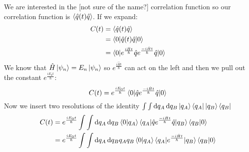 \documentclass[12pt,letterpaper,oneside,final,titlepage]{article}               %
\numberwithin{equation}{section} %
\newcommand{\emiHt}{e^{\frac{-i\hat{H}t}{\hbar}}}
\newcommand{\eiHt}{e^{\frac{i\hat{H}t}{\hbar}}}
\begin{document}
We are interested in the [not sure of the name?] correlation function so our correlation function is $\braket{\hat{q}(t)\hat{q}}$. 
If we expand:
\begin{align}
    C(t) &= \braket{\hat{q}(t)\hat{q}}
    \\   &= \braket{0|\hat{q}(t)\hat{q}|0}
    \\   &= \braket{0|\eiHt\hat{q}\emiHt\hat{q}|0}
\end{align}
We know that $\hat{H}\ket{\psi_{n}} = E_{n}\ket{\psi_{n}}$ so $\eiHt$ can act on the left and 
then we pull out the constant $e^{\frac{iE_{0}t}{\hbar}}$:\\
\begin{equation}
    C(t) = e^{\frac{iE_{0}t}{\hbar}}\braket{0|\hat{q}\emiHt\hat{q}|0}
\end{equation}
Now we insert two resolutions of the identity
$\int\int \dif q_{A}\dif q_{B} \ket{q_{A}}\bra{q_{A}}\ket{q_{B}}\bra{q_{B}}$
\begin{align}
    C(t) &= e^{\frac{iE_{0}t}{\hbar}}\int\int \dif q_{A}\dif q_{B} 
    \braket{0|q_{A}}\braket{q_{A}|\hat{q}\emiHt\hat{q}|q_{B}}\braket{q_{B}|0}
    \\   &= e^{\frac{iE_{0}t}{\hbar}}\int\int \dif q_{A}\dif q_{B} 
    q_{A}q_{B}\braket{0|q_{A}}\braket{q_{A}|\emiHt|q_{B}}\braket{q_{B}|0}
    \label{eq:cor_ins}
\end{align}
\end{document}
